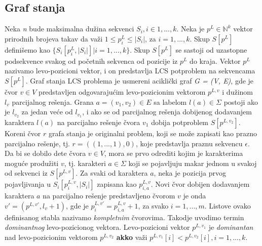 \documentclass{article}
\begin{document}
    \subsection{Graf stanja}
    Neka \emph{n} bude maksimalna dužina sekvenci $S_i, i \in {1,...,k}$. \newline
    \indent Neka je $p^L \in \mathbb{N}^k$ vektor prirodnih brojeva takav da važi $1 \leq p_i^L \leq |S_i|$, za $i = {1,...,k}$. Skup $S[p^L]$ definišemo kao $\{S_i[p_i^L, |S_i|] | i = {1,...,k} \}$. Skup $S[p^L]$ se sastoji od uzastopne podsekvence svakog od početnih sekvenca od pozicije iz $p^L$ do kraja. Vektor $p^L$ nazivamo levo-pozicioni vektor, i on predstavlja LCS potproblem na sekvencama $S[p^L]$. \newline
    \indent Graf stanja LCS problema je usmereni aciklički graf \emph{G = (V, E)}, gde je čvor $v \in V$ predstavljen odgovarajućim levo-pozicionim vektorom $p^{L,v}$ i dužinom $l_v$ parcijalnog rešenja. Grana $a = (v_1, v_2) \in E$ sa labelom $l(a) \in \Sigma$ postoji ako je $l_{v_2}$ za jedan veće od $l_{v_1}$, i ako se od parcijalnog rešenja dobijenog dodavanjem karaktera $l(a)$ na parcijalno rešenje čvora $v_1$ dobija potproblem $S[p^{L,v_2}]$. Koreni čvor $r$ grafa stanja je originalni problem, koji se može zapisati kao prazno parcijalno rešenje, tj. $r = (({1,...,1}), 0)$, koje predstavlja praznu sekvencu $\epsilon$. Da bi se dobilo dete čvora $v \in V$, mora se prvo odrediti kojim je karakterima moguće produžiti $v$, tj. karakteri $a \in \Sigma$ koji se pojavljuju makar jednom u svakoj od sekvenci iz $S[p^{L,v}]$. Za svaki od karaktera $a$, neka je pozicija prvog pojavljivanja u $S_i[p_i^{L,v}, |S_i|]$ zapisana kao $p_{i,a}^{L,v}$. Novi čvor dobijen dodavanjem karaktera $a$ na parcijalno rešenje predstavljeno čvorom $v$ je onda $v' = (p^{L,v'}, l_v + 1)$, gde je $p_i^{L,v'} = p_{i,a}^{L,v} + 1$, za svako $i = {1,...,m}$. Listove ovako definisanog stabla nazivamo \emph{kompletnim} čvorovima.\newline
    \indent Takodje uvodimo termin \emph{dominantnog} levo-pozicionog vektora. Levo-pozicioni vektor $p^{L,v_1}$ je \emph{dominantan} nad levo-pozicionim vektorom $p^{L,v_2}$ \textbf{akko} važi $p^{L,v_1}[i] < p^{L,v_2}[i], i = {1,...,k}$.
\end{document}
